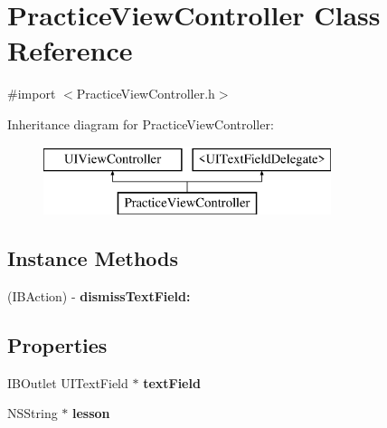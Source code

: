 \hypertarget{interface_practice_view_controller}{\section{Practice\-View\-Controller Class Reference}
\label{interface_practice_view_controller}
}


{\ttfamily \#import $<$Practice\-View\-Controller.\-h$>$}

Inheritance diagram for Practice\-View\-Controller\-:\begin{figure}[H]
\begin{center}
\leavevmode
\includegraphics[height=2.000000cm]{interface_practice_view_controller}
\end{center}
\end{figure}
\subsection*{Instance Methods}
\begin{DoxyCompactItemize}
\item 
\hypertarget{interface_practice_view_controller_a5f3f96ff4f6fd3db2ce0386d4a866ba3}{(I\-B\-Action) -\/ {\bfseries dismiss\-Text\-Field\-:}}\label{interface_practice_view_controller_a5f3f96ff4f6fd3db2ce0386d4a866ba3}

\end{DoxyCompactItemize}
\subsection*{Properties}
\begin{DoxyCompactItemize}
\item 
\hypertarget{interface_practice_view_controller_af0cd918f4e40c5c73d996c78e1272644}{I\-B\-Outlet U\-I\-Text\-Field $\ast$ {\bfseries text\-Field}}\label{interface_practice_view_controller_af0cd918f4e40c5c73d996c78e1272644}

\item 
\hypertarget{interface_practice_view_controller_adc92305a829cb5c3e81427687104516a}{N\-S\-String $\ast$ {\bfseries lesson}}\label{interface_practice_view_controller_adc92305a829cb5c3e81427687104516a}

\end{DoxyCompactItemize}


